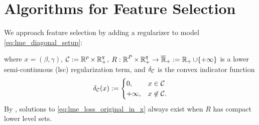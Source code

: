 \section{Algorithms for Feature Selection}
\label{sec:pgd_methods}
We approach feature selection by adding a regularizer to model \eqref{eq:lme_diagonal_setup}: 

where $x = (\beta, \gamma)$, 
$\mathcal{C}:=\operatorname{\mathbb{R}}^p\times \operatorname{\mathbb{R}}^q_+$,
$R:\operatorname{\mathbb{R}}^P\times\operatorname{\mathbb{R}}^q_+\rightarrow {\overline{\operatorname{\mathbb{R}}}}_+:=\operatorname{\mathbb{R}}_+\cup\{+\infty\}$
is a 
lower semi-continuous (lsc) regularization term, and
$\delta_{\mathcal{C}}$ is the convex indicator function
\[
    \delta_{\mathcal{C}}(x) := \begin{cases} 0, &  x \in \mathcal{C} \\ +\infty, & x \not\in \mathcal{C} .\end{cases}
\]  
By \cite[Theorem 2]{Theory1}, solutions to \eqref{eq:lme_loss_original_in_x}
always exist when $R$ has compact lower level sets.
